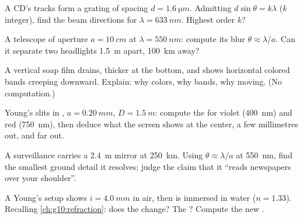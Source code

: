 \begin{exercise}[$\star\star$]\label{exo:g12:light-as-wave:10}
A CD's tracks form a grating of spacing $d = \qty{1.6}{\micro m}$.
Admitting $d \sin\theta = k\lambda$ ($k$ integer), find the beam
directions for $\lambda = \qty{633}{nm}$. Highest order $k$?
\end{exercise}

\begin{exercise}[$\star\star$]\label{exo:g12:light-as-wave:11}
A telescope of aperture $a = \qty{10}{cm}$ at $\lambda =
\qty{550}{nm}$: compute its  blur $\theta \approx
\lambda/a$. Can it separate two headlights \qty{1.5}{m} apart,
\qty{100}{km} away?
\end{exercise}

\begin{exercise}[$\star\star\star$]\label{exo:g12:light-as-wave:12}
A vertical soap film drains, thicker at the bottom, and shows
horizontal colored bands creeping downward. Explain: why colors, why
bands, why moving. (No computation.)
\end{exercise}

\begin{exercise}[$\star\star\star$]\label{exo:g12:light-as-wave:13}
Young's slits in , $a = \qty{0.20}{mm}$, $D = \qty{1.5}{m}$:
compute the  for violet (\qty{400}{nm}) and red
(\qty{750}{nm}), then deduce what the screen shows at the center, a
few millimetres out, and far out.
\end{exercise}

\begin{exercise}[$\star\star\star$]\label{exo:g12:light-as-wave:14}
A surveillance  carries a \qty{2.4}{m} mirror at
\qty{250}{km}. Using $\theta \approx \lambda/a$ at \qty{550}{nm},
find the smallest ground detail it resolves; judge the claim that it
``reads newspapers over your shoulder''.
\end{exercise}

\begin{exercise}[$\star\star\star$]\label{exo:g12:light-as-wave:15}
A Young's setup shows $i = \qty{4.0}{mm}$ in air, then is immersed in
water ($n = 1.33$). Recalling \cref{ch:g10:refraction}: does the
 change? The ? Compute the new .
\end{exercise}

